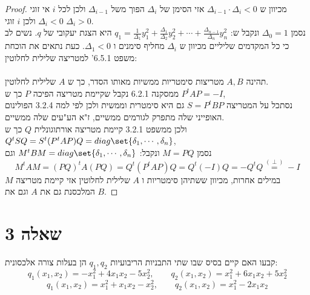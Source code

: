 \documentclass{article}
\DeclarePairedDelimiter\set\{\}
\begin{document}
    \begin{proof}
        מכיוון ש $\Delta_{i-1} \cdot \Delta_i < 0$ אזי הסימן של $\Delta_i$ הפוך משל $\Delta_{i-1}$ ולכן לכל $i$ אי זוגי $\Delta_i < 0$ ולכן $i$ זוגי $\Delta_i > 0$. \\
        נסמן $\Delta_0 = 1$ ונקבל ש: $q_1 = \frac{1}{\Delta_1}y_1^2 + \frac{\Delta_1}{\Delta_2}y_2^2 + \dotsb + \frac{\Delta_{n-1}}{\Delta_n}y_n^2$ היא הצגת יעקובי של $q$.
        נשים לב כי כל המקדמים שליליים מכיוון ש $\Delta_i$ מחליף סימנים ו $\Delta_1 < 0$.
        כעת נתאים את הוכחת משפט 6.5.1' למטריצה שלילית לחלוטין: \\ \\
        תהינה $A,B$ מטריצות סימטריות ממשיות מאותו הסדר, כך ש $A$ שלילית לחלוטין. \\
        ממסקנה 6.2.1 נקבל שקיימת מטריצה הפיכה $P$ כך ש $P^tAP = -I$, \\
        נסתכל על המטריצה $S = P^tBP$ גם היא סימטרית וממשית
        ולכן לפי למה 3.2.4 הפולינום האופייני שלה מתפרק לגורמים ממשיים, ז"א הע"עים שלה ממשיים. \\
        ולכן ממשפט 3.2.1 קיימת מטריצה אורתוגונלית $Q$ כך ש $Q^tSQ = S^t(P^tAP)Q = diag \set{\delta_1, \cdots, \delta_n}$, \\
        נסמן $M=PQ$ ונקבל: $M^tBM = diag \set{\delta_1, \cdots, \delta_n}$
        וגם
        \[ M^tAM = (PQ)^tA(PQ) = Q^t (P^tAP)Q = Q^t(-I)Q = -Q^tQ \overset{(\perp)}= -I \]
        במילים אחרות, מכיוון ששתיהן סימטריות ו $A$ שלילית לחלוטין אזי קיימת מטריצה $M$ המלכסנת גם את $A$ וגם את $B$.
    \end{proof}

\pagebreak
\section*{שאלה 3}
    קבעו האם קיים בסיס שבו שתי התבניות הריבועיות $q_1, q_2$ הן בעלות צורה אלכסונית:
    \begin{equation}
        q_1(x_1, x_2) = -x_1^2 + 4x_1x_2 - 5x_2^2, \qquad q_2(x_1, x_2) = x_1^2 + 6x_1x_2 + 5x_2^2
    \end{equation}
    \begin{equation}
        q_1(x_1, x_2) = x_1^2 + x_1x_2 - x_2^2, \qquad q_2(x_1, x_2) = x_1^2 - 2x_1x_2
    \end{equation}
\end{document}

